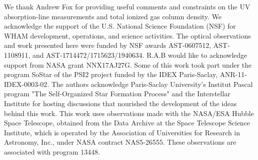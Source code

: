 \documentclass[twocolumn]{aastex63}
\begin{document}
          
\acknowledgments
We thank Andrew Fox for providing useful comments and constraints on the UV absorption-line measurements and total ionized gas column density. We acknowledge the support of the U.S. National Science Foundation (NSF) for WHAM development, operations, and science activities. The optical observations and work presented here were funded by NSF awards AST-0607512, AST-1108911, and AST-1714472/1715623/1940634. R.A.B would like to acknowledge support from NASA grant NNX17AJ27G. Some of this work took part under the program SoStar of the PSI2 project funded by the IDEX Paris-Saclay, ANR-11-IDEX-0003-02. The authors acknowledge Paris-Saclay University's Institut Pascal program "The Self-Organized Star Formation Process" and the Interstellar Institute for hosting discussions that nourished the development of the ideas behind this work. This work uses observations made with the NASA/ESA Hubble Space Telescope, obtained from the Data Archive at the Space Telescope Science Institute, which is operated by the Association of Universities for Research in Astronomy, Inc., under NASA contract NAS5-26555. These observations are associated with program 13448.

\ \vspace{1ex}




\end{document}
